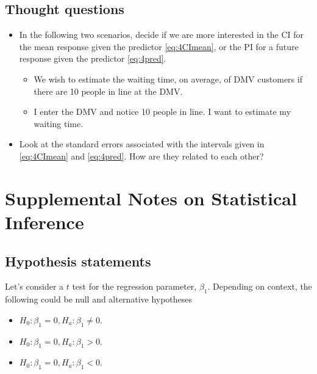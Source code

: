 \documentclass[
]{book}
\providecommand{\tightlist}{%
  \setlength{\itemsep}{0pt}\setlength{\parskip}{0pt}}
\begin{document}
\hypertarget{thought-questions-1}{%
\subsection{Thought questions}\label{thought-questions-1}}

\begin{itemize}
\item
  In the following two scenarios, decide if we are more interested in the CI for the mean response given the predictor \eqref{eq:4CImean}, or the PI for a future response given the predictor \eqref{eq:4pred}.

  \begin{itemize}
  \item
    We wish to estimate the waiting time, on average, of DMV customers if there are 10 people in line at the DMV.
  \item
    I enter the DMV and notice 10 people in line. I want to estimate my waiting time.
  \end{itemize}
\item
  Look at the standard errors associated with the intervals given in \eqref{eq:4CImean} and \eqref{eq:4pred}. How are they related to each other?
\end{itemize}

\hypertarget{supplemental-notes-on-statistical-inference}{%
\section{Supplemental Notes on Statistical Inference}\label{supplemental-notes-on-statistical-inference}}

\hypertarget{hypothesis-statements}{%
\subsection{Hypothesis statements}\label{hypothesis-statements}}

Let's consider a \(t\) test for the regression parameter, \(\beta_1\). Depending on context, the following could be null and alternative hypotheses

\begin{itemize}
\tightlist
\item
  \(H_0: \beta_1 = 0, H_a: \beta_1 \neq 0\).
\item
  \(H_0: \beta_1 = 0, H_a: \beta_1 > 0\).
\item
  \(H_0: \beta_1 = 0, H_a: \beta_1 < 0\).
\end{itemize}
\end{document}

